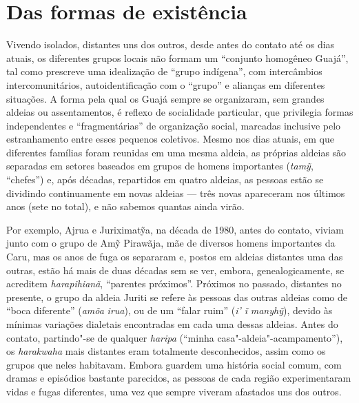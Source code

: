 \section{Das formas de existência}\label{das-formas-de-existuxeancia}

Vivendo isolados, distantes uns dos outros, desde antes do contato até
os dias atuais, os diferentes grupos locais não formam um ``conjunto
homogêneo Guajá'', tal como prescreve uma idealização de ``grupo
indígena'', com intercâmbios intercomunitários, autoidentificação com o
``grupo'' e alianças em diferentes situações. A forma pela qual os Guajá
sempre se organizaram, sem grandes aldeias ou assentamentos, é reflexo
de socialidade particular, que privilegia formas independentes e
``fragmentárias'' de organização social, marcadas inclusive pelo
estranhamento entre esses pequenos coletivos. Mesmo nos dias atuais, em
que diferentes famílias foram reunidas em uma mesma aldeia, as próprias
aldeias são separadas em setores baseados em grupos de homens
importantes (\emph{tamỹ}, ``chefes'') e, após décadas, repartidos em
quatro aldeias, as pessoas estão se dividindo continuamente em novas
aldeias --- três novas apareceram nos últimos anos (sete no total), e não
sabemos quantas ainda virão.

Por exemplo, Ajrua e Juriximatỹa, na década de 1980, antes do contato,
viviam junto com o grupo de Amỹ Pirawãja, mãe de diversos homens
importantes da  Caru, mas os anos de fuga os separaram e, postos em
aldeias distantes uma das outras, estão há mais de duas décadas sem se
ver, embora, genealogicamente, se acreditem \emph{harapihianã},
``parentes próximos''. Próximos no passado, distantes no presente, o grupo
da aldeia Juriti se refere às pessoas das outras aldeias como de ``boca
diferente'' (\emph{amõa} \emph{irua}), ou de um ``falar ruim'' (\emph{i' ĩ}
\emph{manyhỹ}), devido às mínimas variações dialetais encontradas em
cada uma dessas aldeias. Antes do contato, partindo"-se de qualquer
\emph{haripa} (``minha casa"-aldeia"-acampamento''), os \emph{harakwaha}
mais distantes eram totalmente desconhecidos, assim como os grupos que
neles habitavam. Embora guardem uma história social comum, com dramas e
episódios bastante parecidos, as pessoas de cada região experimentaram
vidas e fugas diferentes, uma vez que sempre viveram afastados uns dos
outros.

